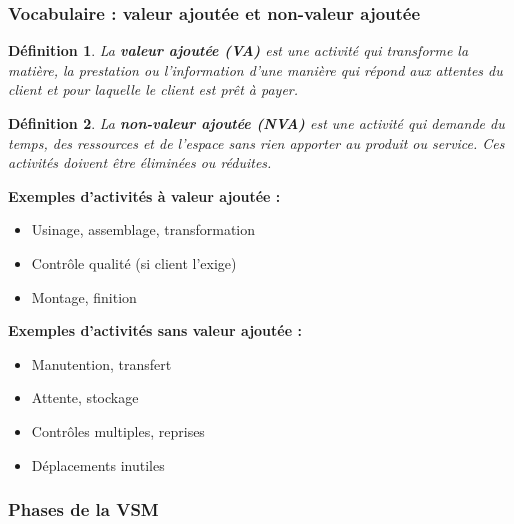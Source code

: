 \documentclass[a4paper,12pt]{article}
\newtheorem{definition}{Définition}[section]
\begin{document}
\subsubsection{Vocabulaire : valeur ajoutée et non-valeur ajoutée}

\begin{definition}
La \textbf{valeur ajoutée (VA)} est une activité qui transforme la matière, la prestation ou l'information d'une manière qui répond aux attentes du client et pour laquelle le client est prêt à payer.
\end{definition}

\begin{definition}
La \textbf{non-valeur ajoutée (NVA)} est une activité qui demande du temps, des ressources et de l'espace sans rien apporter au produit ou service. Ces activités doivent être éliminées ou réduites.
\end{definition}

\textbf{Exemples d'activités à valeur ajoutée :}
\begin{itemize}
    \item Usinage, assemblage, transformation
    \item Contrôle qualité (si client l'exige)
    \item Montage, finition
\end{itemize}

\textbf{Exemples d'activités sans valeur ajoutée :}
\begin{itemize}
    \item Manutention, transfert
    \item Attente, stockage
    \item Contrôles multiples, reprises
    \item Déplacements inutiles
\end{itemize}

\subsubsection{Phases de la VSM}
\end{document}
